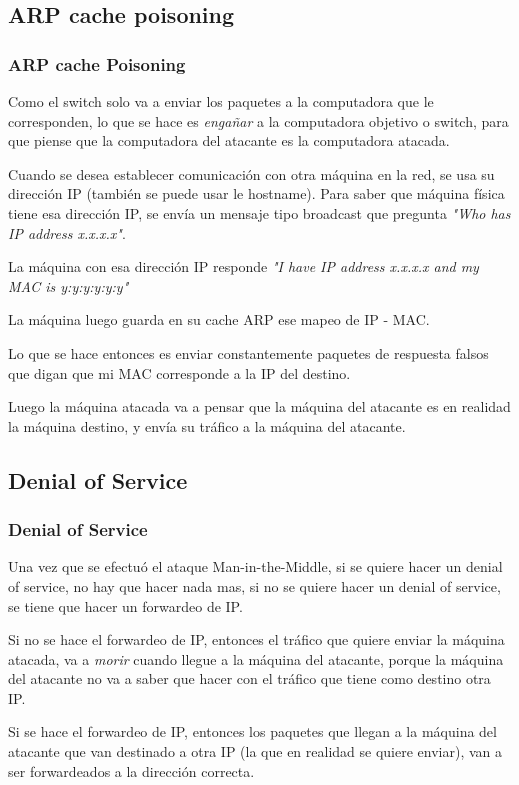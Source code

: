 \documentclass{beamer}
\begin{document}
\subsection{ARP cache poisoning}
\begin{frame}[allowframebreaks]
\frametitle{ARP cache Poisoning}
\par Como el switch solo va a enviar los paquetes a la computadora que le corresponden, lo que se hace es \textit{engañar} a la computadora objetivo o switch, para que piense que la computadora del atacante es la computadora atacada.
\par Cuando se desea establecer comunicación con otra máquina en la red, se usa su dirección IP (también se puede usar le hostname). Para saber que máquina física tiene esa dirección IP, se envía un mensaje tipo broadcast que pregunta \textit{"Who has IP address x.x.x.x"}.
\par La máquina con esa dirección IP responde \textit{"I have IP address x.x.x.x and my MAC is y:y:y:y:y:y"}
\par La máquina luego guarda en su cache ARP ese mapeo de IP - MAC.
\par Lo que se hace entonces es enviar constantemente paquetes de respuesta falsos que digan que mi MAC corresponde a la IP del destino.
\par Luego la máquina atacada va a pensar que la máquina del atacante es en realidad la máquina destino, y envía su tráfico a la máquina del atacante.
\end{frame}


\subsection{Denial of Service}
\begin{frame}[allowframebreaks]
	\frametitle{Denial of Service}
	\par Una vez que se efectuó el ataque Man-in-the-Middle, si se quiere hacer un denial of service, no hay que hacer nada mas, si no se quiere hacer un denial of service, se tiene que hacer un forwardeo de IP.
	\par Si no se hace el forwardeo de IP, entonces el tráfico que quiere enviar la máquina atacada, va a \textit{morir} cuando llegue a la máquina del atacante, porque la máquina del atacante no va a saber que hacer con el tráfico que tiene como destino otra IP.
	\par Si se hace el forwardeo de IP, entonces los paquetes que llegan a la máquina del atacante que van destinado a otra IP (la que en realidad se quiere enviar), van a ser forwardeados a la dirección correcta.
\end{frame}
\end{document}
